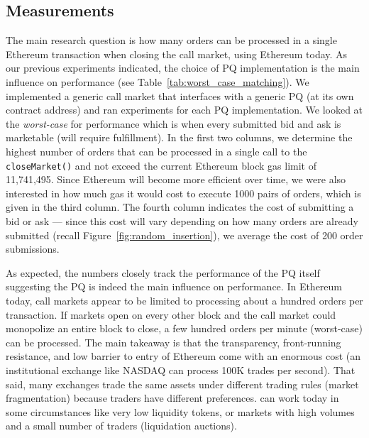 
 \subsection{Measurements}
  
 
 
 
The main research question is how many orders can be processed in a single Ethereum transaction when closing the call market, using Ethereum today. As our previous experiments indicated, the choice of PQ implementation is the main influence on performance (see Table~\ref{tab:worst_case_matching}). We implemented a generic call market that interfaces with a generic PQ (at its own contract address) and ran experiments for each PQ implementation. We looked at the \textit{worst-case} for performance which is when every submitted bid and ask is marketable (\ie will require fulfillment). In the first two columns, we determine the highest number of orders that can be processed in a single call to the \texttt{closeMarket()} and not exceed the current Ethereum block gas limit of 11,741,495. Since Ethereum will become more efficient over time, we were also interested in how much gas it would cost to execute 1000 pairs of orders, which is given in the third column. The fourth column indicates the cost of submitting a bid or ask --- since this cost will vary depending on how many orders are already submitted (recall Figure~\ref{fig:random_insertion}), we average the cost of 200 order submissions. 

As expected, the numbers closely track the performance of the PQ itself suggesting the PQ is indeed the main influence on performance. In Ethereum today, call markets appear to be limited to processing about a hundred orders per transaction. If markets open on every other block and the call market could monopolize an entire block to close, a few hundred orders per minute (worst-case) can be processed. The main takeaway is that the transparency, front-running resistance, and low barrier to entry of Ethereum come with an enormous cost (\ie an institutional exchange like NASDAQ can process 100K trades per second). That said, many exchanges trade the same assets under different trading rules (\ie market fragmentation) because traders have different preferences. \cm can work today in some circumstances like very low liquidity tokens, or markets with high volumes and a small number of traders (\eg liquidation auctions). 

